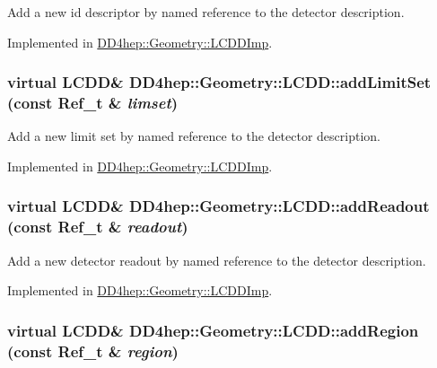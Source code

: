 Add a new id descriptor by named reference to the detector description. 

Implemented in \hyperlink{class_d_d4hep_1_1_geometry_1_1_l_c_d_d_imp_ac67bb4f3004262373f24c9f02431dbe0}{DD4hep::Geometry::LCDDImp}.\hypertarget{class_d_d4hep_1_1_geometry_1_1_l_c_d_d_af11d7a6aaeb91256f14d5892d84e2b30}{
\subsubsection[{addLimitSet}]{\setlength{\rightskip}{0pt plus 5cm}virtual {\bf LCDD}\& DD4hep::Geometry::LCDD::addLimitSet (const {\bf Ref\_\-t} \& {\em limset})}}
\label{class_d_d4hep_1_1_geometry_1_1_l_c_d_d_af11d7a6aaeb91256f14d5892d84e2b30}


Add a new limit set by named reference to the detector description. 

Implemented in \hyperlink{class_d_d4hep_1_1_geometry_1_1_l_c_d_d_imp_a846ba4e66d0a38eddaae795bf4b4b43b}{DD4hep::Geometry::LCDDImp}.\hypertarget{class_d_d4hep_1_1_geometry_1_1_l_c_d_d_a9823ad063bd9986e92e66c29f13e28f7}{
\subsubsection[{addReadout}]{\setlength{\rightskip}{0pt plus 5cm}virtual {\bf LCDD}\& DD4hep::Geometry::LCDD::addReadout (const {\bf Ref\_\-t} \& {\em readout})}}
\label{class_d_d4hep_1_1_geometry_1_1_l_c_d_d_a9823ad063bd9986e92e66c29f13e28f7}


Add a new detector readout by named reference to the detector description. 

Implemented in \hyperlink{class_d_d4hep_1_1_geometry_1_1_l_c_d_d_imp_a876f792d25fd05a99646cd6c0df77d09}{DD4hep::Geometry::LCDDImp}.\hypertarget{class_d_d4hep_1_1_geometry_1_1_l_c_d_d_a633c913dcf2a31b52976e5f5bd8a63e2}{
\subsubsection[{addRegion}]{\setlength{\rightskip}{0pt plus 5cm}virtual {\bf LCDD}\& DD4hep::Geometry::LCDD::addRegion (const {\bf Ref\_\-t} \& {\em region})}}
\label{class_d_d4hep_1_1_geometry_1_1_l_c_d_d_a633c913dcf2a31b52976e5f5bd8a63e2}


